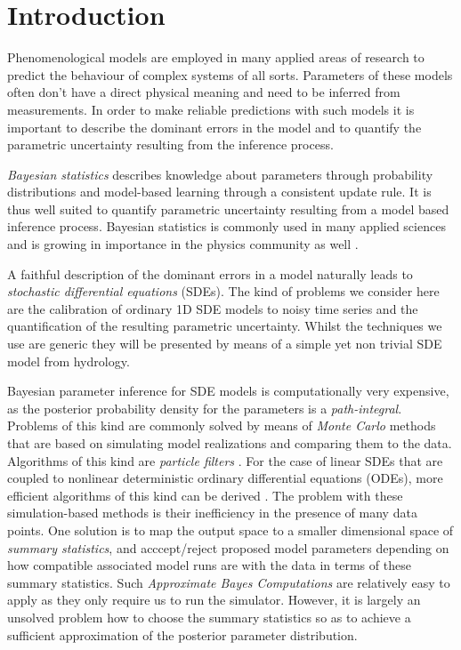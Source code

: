 \documentclass[12pt,a4paper,final]{iopart}
\begin{document}
\submitto{\NJP}

\section{Introduction}

Phenomenological models are employed in many applied areas of research to predict the behaviour of complex systems of all sorts.
Parameters of these models often don't have a direct physical meaning and need to be inferred from measurements.
In order to make reliable predictions with such models it is important to describe the dominant errors in the model and to quantify the parametric uncertainty resulting from the inference process.

{\em Bayesian statistics} describes knowledge about parameters through probability distributions and model-based learning through a consistent update rule. It is thus well suited to quantify parametric uncertainty resulting from a model based inference process.
Bayesian statistics is commonly used in many applied sciences and is growing in importance in the physics community as well \cite{vonToussaint_2011}.

A faithful description of the dominant errors in a model naturally leads to {\em stochastic differential equations} (SDEs).
The kind of problems we consider here are the calibration of ordinary 1D SDE models to noisy time series and the quantification of the resulting parametric uncertainty.
Whilst the techniques we use are generic they will be presented by means of a simple yet non trivial SDE model from hydrology.

Bayesian parameter inference for SDE models is computationally very expensive, as the posterior probability density for the parameters is a {\em path-integral}.
Problems of this kind are commonly solved by means of {\em Monte Carlo} methods that are based on simulating model realizations and comparing them to the data. Algorithms of this kind are {\em particle filters} \cite{chopin_2013_SMC2}. For the case of linear SDEs that are coupled to nonlinear deterministic ordinary differential equations (ODEs), more efficient algorithms of this kind can be derived \cite{tomassini_2009_smoothing, reichert_2009_timedepParameters}.
The problem with these simulation-based methods is their inefficiency in the presence of many data points.
One solution is to map the output space to a smaller dimensional space of {\em summary statistics}, and acccept/reject proposed model parameters depending on how compatible associated model runs are with the data in terms of these summary statistics.
Such {\em Approximate Bayes Computations} \cite{marin_2012_ABC, Albert_2014_ABC} are relatively easy to apply as they only require us to run the simulator. However, it is largely an unsolved problem how to choose the summary statistics so as to achieve a sufficient approximation of the posterior parameter distribution.
\end{document}
